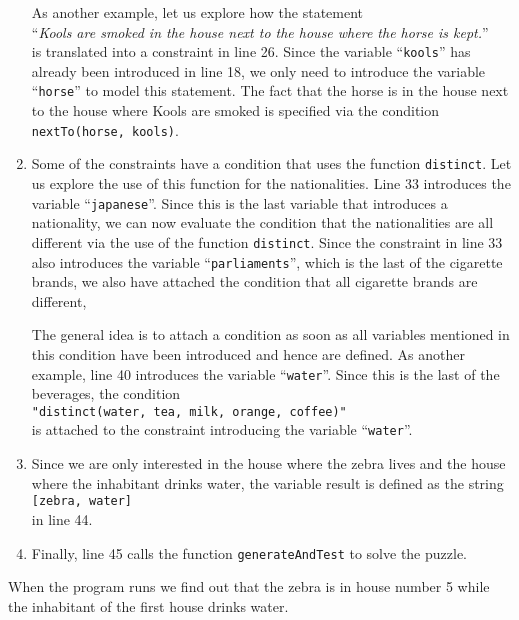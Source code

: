 \begin{enumerate}
      As another example, let us explore how the statement 
      \\[0.2cm]
      \hspace*{1.3cm}
      ``\textsl{Kools are smoked in the house next to the house where the horse is kept.}'' 
      \\[0.2cm]
      is translated into a constraint in line 26.  Since the variable ``\texttt{kools}'' has already
      been introduced in line 18, we only need to introduce the variable ``\texttt{horse}'' to model
      this statement.  The fact that the horse is in the house next to the house where Kools are
      smoked is specified via the condition
      \\[0.2cm]
      \hspace*{1.3cm}
      \texttt{nextTo(horse, kools)}.
\item Some of the constraints have a condition that uses the function \texttt{distinct}.  Let us
      explore the use of this function for the nationalities.  Line 33 introduces the
      variable ``\texttt{japanese}''.  Since this is the last variable that introduces a nationality,
      we can now evaluate the condition that the nationalities are all different via
      the use of the function \texttt{distinct}.  Since the constraint in line 33 also introduces
      the variable ``\texttt{parliaments}'', which is the last of the cigarette brands, we also have
      attached the condition that all cigarette brands are different,
      
      The general idea is to attach a condition as soon as all variables mentioned in this condition
      have been introduced and hence are defined.  As another example, line 40 introduces the
      variable ``\texttt{water}''.  Since this is the last of the beverages, the condition
      \\[0.2cm]
      \hspace*{1.3cm}
      \texttt{"distinct(water, tea, milk, orange, coffee)"}
      \\[0.2cm]
      is attached to the constraint introducing the variable ``\texttt{water}''.
\item Since we are only interested in the house where the zebra lives and the house where the
      inhabitant drinks water, the variable result is defined as the string
      \\[0.2cm]
      \hspace*{1.3cm}
      \texttt{[zebra, water]}
      \\[0.2cm]
      in line 44.
\item Finally, line 45 calls the function \texttt{generateAndTest} to solve the puzzle.
\end{enumerate}
When the program runs we find out that the zebra is in house number 5 while the inhabitant of the
first house drinks water.


